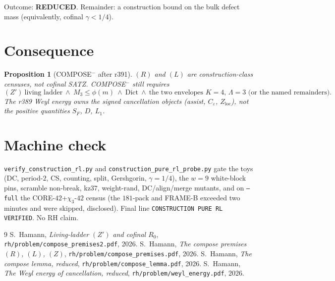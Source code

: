 \documentclass[11pt]{article}
\newtheorem{prop}{Proposition}
\theoremstyle{remark}
\begin{document}
\noindent
Outcome: \textbf{REDUCED}.  Remainder: a construction bound on
the bulk defect mass (equivalently, cofinal $\gamma<1/4$).

\section{Consequence}\label{sec:C}

\begin{prop}[COMPOSE$^-$ after r391]\label{prop:C}
$(R)$ and $(L)$ are construction-class censuses, not cofinal
SATZ.  COMPOSE$^-$ still requires
\[
  (Z')\ \text{living ladder}\ \wedge\
  M_3\le\phi(m)\ \wedge\
  \mathrm{Dict}\ \wedge\
  \text{the two envelopes $K=4$, $\Lambda=3$ (or the named remainders).}
\]
The r389 Weyl energy owns the \emph{signed} cancellation
objects (assist, $C_\varepsilon$, $Z_{\mathrm{loc}}$), not the
positive quantities $S_F$, $D$, $L_1$.
\end{prop}

\section{Machine check}\label{sec:machine}

\texttt{verify\_construction\_rl.py} and
\texttt{construction\_pure\_rl\_probe.py} gate the toys
(DC, period-$2$, CS, counting, split, Gershgorin, $\gamma=1/4$),
the $w=9$ white-block pins, scramble non-break, kz$37$,
weight-rand, DC/align/merge mutants, and on \texttt{--full}
the CORE-$42$+$\chi_3$-$42$ census (the $181$-pack and FRAME-B
exceeded two minutes and were skipped, disclosed).  Final line
\texttt{CONSTRUCTION PURE RL VERIFIED}.  No RH claim.

\begin{thebibliography}{9}
\bibitem{r386} S.~Hamann,
\textit{Living-ladder $(Z')$ and cofinal $R_0$},
\texttt{rh/problem/compose\_premises2.pdf}, 2026.
\bibitem{r383} S.~Hamann,
\textit{The compose premises $(R)$, $(L)$, $(Z)$},
\texttt{rh/problem/compose\_premises.pdf}, 2026.
\bibitem{r378} S.~Hamann,
\textit{The compose lemma, reduced},
\texttt{rh/problem/compose\_lemma.pdf}, 2026.
\bibitem{r389} S.~Hamann,
\textit{The Weyl energy of cancellation, reduced},
\texttt{rh/problem/weyl\_energy.pdf}, 2026.
\end{thebibliography}
\end{document}
